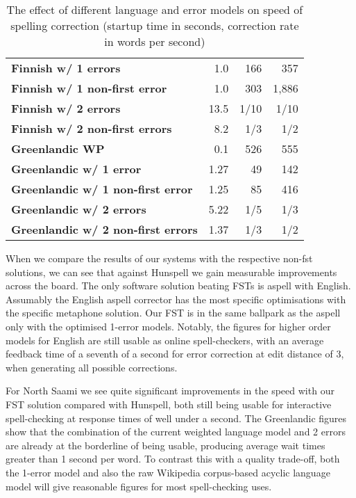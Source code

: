 \documentclass[a4paper,12pt]{article}
\begin{document}
\begin{table}
\begin{tabular}{|l|r|r|r|}
        \bf Finnish w/ 1 errors   & 1.0  & 166 & 357   \\
\bf Finnish w/ 1 non-first error  & 1.0  & 303 & 1,886  \\
        \bf Finnish w/ 2 errors   & 13.5 & 1/10 & 1/10 \\
\bf Finnish w/ 2 non-first errors & 8.2  & 1/3  & 1/2 \\
        \hline
        \bf Greenlandic WP    & 0.1  & 526 & 555\\
        \hline
        \bf Greenlandic w/ 1 error    & 1.27 & 49 & 142 \\
\bf Greenlandic w/ 1 non-first error  & 1.25 & 85 & 416 \\
       \bf Greenlandic w/ 2 errors    & 5.22 & 1/5 & 1/3 \\
\bf Greenlandic w/ 2 non-first errors & 1.37 & 1/3 & 1/2 \\
        \hline
    \end{tabular}
    \caption{The effect of different language and error models on speed of
        spelling correction (startup time in seconds, correction rate in 
        words per second) \label{table:speed}}
\end{table}

When we compare the results of our systems with the respective non-fst
solutions, we can see that against Hunspell we gain measurable improvements
across the board. The only software solution beating FSTs is aspell with
English. Assumably the English aspell corrector has the most specific
optimisations with the specific metaphone solution. Our FST is in the same
ballpark as the aspell only with the optimised 1-error models.  Notably, the
figures for higher order models for English are still usable as online
spell-checkers, with an average feedback time of a seventh of a second for
error correction at edit distance of 3, when generating all possible
corrections.

For North Saami we see quite significant improvements in the speed with our FST
solution compared with Hunspell, both still being usable for interactive
spell-checking at response times of well under a second. The Greenlandic
figures show that the combination of the current weighted language model and 2
errors are already at the borderline of being usable, producing average wait
times greater than 1 second per word. To contrast this with a quality
trade-off, both the 1-error model and also the raw Wikipedia corpus-based
acyclic language model will give reasonable figures for most spell-checking
uses.
\end{document}
